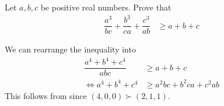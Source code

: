 \documentclass[inequalities.tex]{subfile}
\begin{document}
		\begin{problem}
			Let $a,b,c$ be positive real numbers. Prove that
				\begin{align*}
					\dfrac{a^{3}}{bc}+\dfrac{b^{3}}{ca}+\dfrac{c^{3}}{ab}
						& \geq a+b+c
				\end{align*}

				\begin{solution}
					We can rearrange the inequality into
						\begin{align*}
							\dfrac{a^{4}+b^{4}+c^{4}}{abc}
								& \geq a+b+c\\
							\iff a^{4}+b^{4}+c^{4}
								& \geq a^{2}bc+b^2ca+c^{2}ab
						\end{align*}
					This follows from  since $(4,0,0)\succ(2,1,1)$.
				\end{solution}
		\end{problem}
\end{document}
